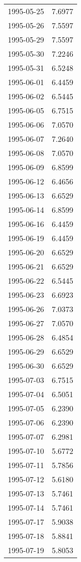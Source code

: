 \begin{tabular}{lr}
1995-05-25 &      7.6977 \\
1995-05-26 &      7.5597 \\
1995-05-29 &      7.5597 \\
1995-05-30 &      7.2246 \\
1995-05-31 &      6.5248 \\
1995-06-01 &      6.4459 \\
1995-06-02 &      6.5445 \\
1995-06-05 &      6.7515 \\
1995-06-06 &      7.0570 \\
1995-06-07 &      7.2640 \\
1995-06-08 &      7.0570 \\
1995-06-09 &      6.8599 \\
1995-06-12 &      6.4656 \\
1995-06-13 &      6.6529 \\
1995-06-14 &      6.8599 \\
1995-06-16 &      6.4459 \\
1995-06-19 &      6.4459 \\
1995-06-20 &      6.6529 \\
1995-06-21 &      6.6529 \\
1995-06-22 &      6.5445 \\
1995-06-23 &      6.6923 \\
1995-06-26 &      7.0373 \\
1995-06-27 &      7.0570 \\
1995-06-28 &      6.4854 \\
1995-06-29 &      6.6529 \\
1995-06-30 &      6.6529 \\
1995-07-03 &      6.7515 \\
1995-07-04 &      6.5051 \\
1995-07-05 &      6.2390 \\
1995-07-06 &      6.2390 \\
1995-07-07 &      6.2981 \\
1995-07-10 &      5.6772 \\
1995-07-11 &      5.7856 \\
1995-07-12 &      5.6180 \\
1995-07-13 &      5.7461 \\
1995-07-14 &      5.7461 \\
1995-07-17 &      5.9038 \\
1995-07-18 &      5.8841 \\
1995-07-19 &      5.8053 \\

\end{tabular}
